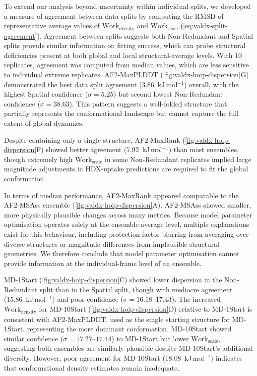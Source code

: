 To extend our analysis beyond uncertainty within individual splits, we developed a measure of agreement between data splits by computing the RMSD of representative average values of $\text{Work}_\text{density}$ and $\text{Work}_\text{scale}$ (\cref{eq:valdx-split-agreement}). Agreement between splits suggests both Non-Redundant and Spatial splits provide similar information on fitting success, which can probe structural deficiencies present at both global and local structural-average levels. With 10 replicates, agreement was computed from median values, which are less sensitive to individual extreme replicates. AF2-MaxPLDDT (\cref{fig:valdx-hoip-dispersion}G) demonstrated the best data split agreement (3.86~kJ\,mol$^{-1}$) overall, with the highest Spatial confidence ($\sigma=5.25$) but second lowest Non-Redundant confidence ($\sigma=38.63$). This pattern suggests a well-folded structure that partially represents the conformational landscape but cannot capture the full extent of global dynamics.

Despite containing only a single structure, AF2-MaxRank (\cref{fig:valdx-hoip-dispersion}F) showed better agreement (7.92~kJ\,mol$^{-1}$) than most ensembles, though extremely high $\text{Work}_\text{scale}$ in some Non-Redundant replicates implied large magnitude adjustments in HDX-uptake predictions are required to fit the global conformation.

In terms of median performance, AF2-MaxRank appeared comparable to the AF2-MSAss ensemble (\cref{fig:valdx-hoip-dispersion}A). AF2-MSAss showed smaller, more physically plausible changes across many metrics. Because model parameter optimisation operates solely at the ensemble-average level, multiple explanations exist for this behaviour, including protection factor blurring from averaging over diverse structures or magnitude differences from implausible structural geometries. We therefore conclude that model parameter optimisation cannot provide information at the individual-frame level of an ensemble.

MD-1Start (\cref{fig:valdx-hoip-dispersion}C) showed lower dispersion in the Non-Redundant split than in the Spatial split, though with mediocre agreement (15.86~kJ\,mol$^{-1}$) and poor confidence ($\sigma=16.18$--$17.43$). The increased $\text{Work}_\text{density}$ for MD-10Start (\cref{fig:valdx-hoip-dispersion}D) relative to MD-1Start is consistent with AF2-MaxPLDDT, used as the single starting structure for MD-1Start, representing the more dominant conformation. MD-10Start showed similar confidence ($\sigma=17.27$--$17.44$) to MD-1Start but lower $\text{Work}_\text{scale}$, suggesting both ensembles are similarly plausible despite MD-10Start's additional diversity. However, poor agreement for MD-10Start (18.08~kJ\,mol$^{-1}$) indicates that conformational density estimates remain inadequate.

